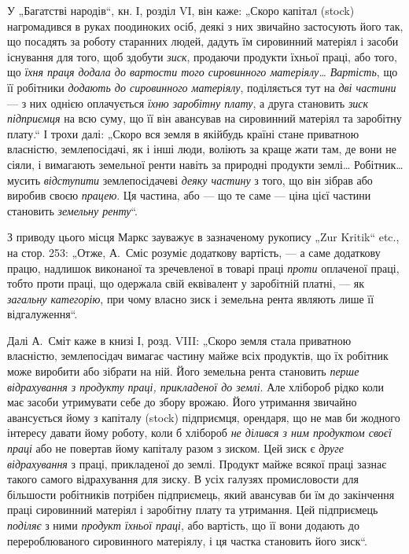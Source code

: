 У „Багатстві народів“, кн. І, розділ VI, він каже: „Скоро капітал
(stock) нагромадився в руках поодиноких осіб, деякі з них звичайно застосують
його так, що посадять за роботу старанних людей, дадуть їм
сировинний матеріял і засоби існування для того, щоб здобути \emph{зиск},
продаючи продукти їхньої праці, або того, що \emph{їхня праця додала до
вартости того сировинного матеріялу\dots{} Вартість}, що її робітники
\emph{додають до сировинного матеріялу}, поділяється тут на \emph{дві частини} —
з них однією оплачується \emph{їхню заробітну плату}, а друга становить
\emph{зиск підприємця} на всю суму, що її він авансував на сировинний
матеріял та заробітну плату.“ І трохи далі: „Скоро вся земля в якійбудь
країні стане приватною власністю, землепосідачі, як і інші люди,
воліють за краще жати там, де вони не сіяли, і вимагають земельної
ренти навіть за природні продукти землі\dots{} Робітник\dots{} мусить \emph{відступити}
землепосідачеві \emph{деяку частину} з того, що він зібрав або виробив
своєю \emph{працею}. Ця частина, або — що те саме — ціна цієї частини становить
\emph{земельну ренту}“.

З приводу цього місця Маркс зауважує в зазначеному рукопису
„Zur Kritik“ etc., на стор. 253: „Отже, А.~Сміс розуміє додаткову вартість,
— а саме додаткову працю, надлишок виконаної та зречевленої в
товарі праці \emph{проти} оплаченої праці, тобто проти праці, що одержала
свій еквівалент у заробітній платні, — як \emph{загальну категорію}, при чому
власно зиск і земельна рента являють лише її відгалуження“.

Далі А.~Сміт каже в книзі І, розд. VIII: „Скоро земля стала приватною
власністю, землепосідач вимагає частину майже всіх продуктів, що
їх робітник може виробити або зібрати на ній. Його земельна рента
становить \emph{перше відрахування з продукту праці, прикладеної до землі}.
Але хлібороб рідко коли має засоби утримувати себе до збору врожаю.
Його утримання звичайно авансується йому з капіталу (stock) підприємця,
орендаря, що не мав би жодного інтересу давати йому роботу, коли б
хлібороб \emph{не ділився з ним продуктом своєї праці} або не повертав йому
капіталу разом з зиском. Цей зиск є \emph{друге відрахування} з праці, прикладеної
до землі. Продукт майже всякої праці зазнає такого самого
відрахування для зиску. В усіх галузях промисловости для більшости робітників
потрібен підприємець, який авансував би їм до закінчення праці
сировинний матеріял і заробітну плату та утримання. Цей підприємець
\emph{поділяє} з ними \emph{продукт їхньої праці}, або вартість, що її вони додають
до перероблюваного сировинного матеріялу, і ця частка становить його
зиск“.

